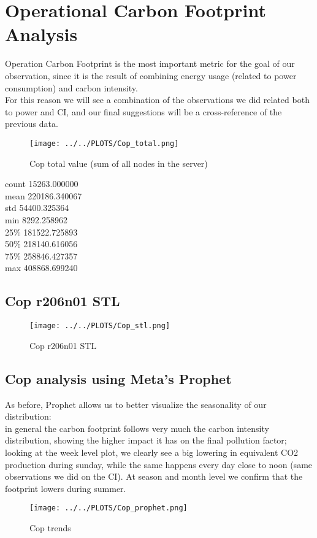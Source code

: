 \section{Operational Carbon Footprint Analysis}
Operation Carbon Footprint is the most important metric for the goal of our observation, since it is the result of combining energy usage (related to power consumption) and carbon intensity. \\
For this reason we will see a combination of the observations we did related both to power and CI, and our final suggestions will be a cross-reference of the previous data.

\vspace{-15pt}

\begin{figure}[H]
\centering
\texttt{[image: ../../PLOTS/Cop\_total.png]}
\captionsetup{skip=-10pt}
\caption{Cop total value (sum of all nodes in the server)}
\label{fig:Cop_total}
\end{figure}

\begin{center}
count     15263.000000 \\
mean     220186.340067 \\
std       54400.325364 \\
min        8292.258962 \\
25\%      181522.725893 \\
50\%      218140.616056 \\
75\%      258846.427357 \\
max      408868.699240   
\end{center}

\subsection{Cop r206n01 STL}

\vspace{-10pt}

\begin{figure}[H]
\centering
\texttt{[image: ../../PLOTS/Cop\_stl.png]}
\captionsetup{skip=-10pt}
\caption{Cop r206n01 STL}
\label{fig:Cop_r206n01_stl}
\end{figure}

\subsection{Cop analysis using Meta's Prophet}
As before, Prophet allows us to better visualize the seasonality of our distribution: \\
in general the carbon footprint follows very much the carbon intensity distribution, showing the higher impact it has on the final pollution factor;
looking at the week level plot, we clearly see a big lowering in equivalent CO2 production during sunday, while the same happens every day close to noon (same observations we did on the CI). 
At season and month level we confirm that the footprint lowers during summer.

\vspace{-10pt}

\begin{figure}[H]
\centering
\texttt{[image: ../../PLOTS/Cop\_prophet.png]}
\captionsetup{skip=-10pt}
\caption{Cop trends}
\label{fig:Cop_prophet}
\end{figure}